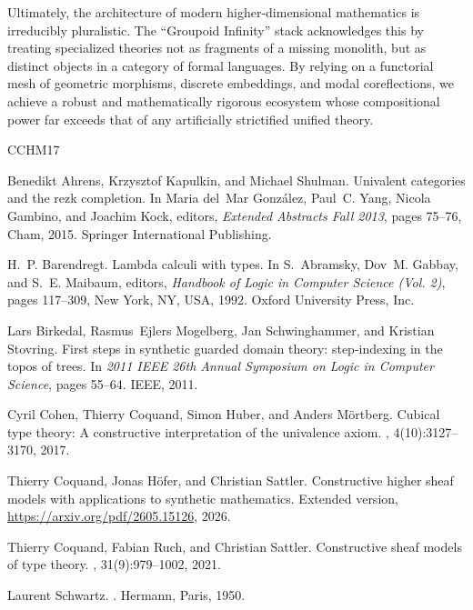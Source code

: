\documentclass{article}
\theoremstyle{definition}
\theoremstyle{plain}
\begin{document}
Ultimately, the architecture of modern higher-dimensional mathematics is irreducibly pluralistic.
The ``Groupoid Infinity'' stack acknowledges this by treating specialized theories not as fragments
of a missing monolith, but as distinct objects in a category of formal languages. By relying on a
functorial mesh of geometric morphisms, discrete embeddings, and modal coreflections, we achieve
a robust and mathematically rigorous ecosystem whose compositional power far exceeds that of any
artificially strictified unified theory.

\begin{thebibliography}{CCHM17}

Benedikt Ahrens, Krzysztof Kapulkin, and Michael Shulman.
\newblock Univalent categories and the rezk completion.
\newblock In Maria del~Mar Gonz{\'a}lez, Paul~C. Yang, Nicola Gambino, and
  Joachim Kock, editors, {\em Extended Abstracts Fall 2013}, pages 75--76,
  Cham, 2015. Springer International Publishing.

H.~P. Barendregt.
\newblock Lambda calculi with types.
\newblock In S.~Abramsky, Dov~M. Gabbay, and S.~E. Maibaum, editors, {
  \em Handbook of Logic in Computer Science (Vol. 2)}, pages 117--309,
  New York, NY, USA, 1992. Oxford University Press, Inc.

Lars Birkedal, Rasmus~Ejlers Mogelberg, Jan Schwinghammer, and Kristian Stovring.
\newblock First steps in synthetic guarded domain theory: step-indexing in the topos of trees.
\newblock In {\em 2011 IEEE 26th Annual Symposium on Logic in Computer Science}, pages 55--64. IEEE, 2011.

Cyril Cohen, Thierry Coquand, Simon Huber, and Anders M{\"{o}}rtberg.
\newblock Cubical type theory: {A} constructive interpretation of the univalence axiom.
, 4(10):3127--3170, 2017.

Thierry Coquand, Jonas H{\"{o}}fer, and Christian Sattler.
\newblock Constructive higher sheaf models with applications to synthetic mathematics.
\newblock Extended version, \url{https://arxiv.org/pdf/2605.15126}, 2026.

Thierry Coquand, Fabian Ruch, and Christian Sattler.
\newblock Constructive sheaf models of type theory.
, 31(9):979--1002, 2021.

Laurent Schwartz.
.
\newblock Hermann, Paris, 1950.


\end{thebibliography}
\end{document}
